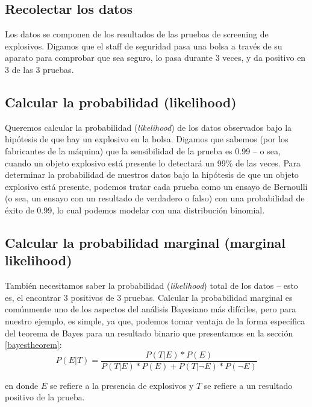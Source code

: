\documentclass[
  12pt,
]{book}
\begin{document}
\hypertarget{recolectar-los-datos}{%
\subsection{Recolectar los datos}\label{recolectar-los-datos}}

Los datos se componen de los resultados de las pruebas de screening de explosivos. Digamos que el staff de seguridad pasa una bolsa a través de su aparato para comprobar que sea seguro, lo pasa durante 3 veces, y da positivo en 3 de las 3 pruebas.

\hypertarget{calcular-la-probabilidad-likelihood}{%
\subsection{Calcular la probabilidad (likelihood)}\label{calcular-la-probabilidad-likelihood}}

Queremos calcular la probabilidad (\emph{likelihood}) de los datos observados bajo la hipótesis de que hay un explosivo en la bolsa. Digamos que sabemos (por los fabricantes de la máquina) que la sensibilidad de la prueba es 0.99 -- o sea, cuando un objeto explosivo está presente lo detectará un 99\% de las veces. Para determinar la probabilidad de nuestros datos bajo la hipótesis de que un objeto explosivo está presente, podemos tratar cada prueba como un ensayo de Bernoulli (o sea, un ensayo con un resultado de verdadero o falso) con una probabilidad de éxito de 0.99, lo cual podemos modelar con una distribución binomial.

\hypertarget{calcular-la-probabilidad-marginal-marginal-likelihood}{%
\subsection{Calcular la probabilidad marginal (marginal likelihood)}\label{calcular-la-probabilidad-marginal-marginal-likelihood}}

También necesitamos saber la probabilidad (\emph{likelihood}) total de los datos -- esto es, el encontrar 3 positivos de 3 pruebas. Calcular la probabilidad marginal es comúnmente uno de los aspectos del análisis Bayesiano más difíciles, pero para nuestro ejemplo, es simple, ya que, podemos tomar ventaja de la forma específica del teorema de Bayes para un resultado binario que presentamos en la sección \ref{bayestheorem}:
\[
P(E|T) = \frac{P(T|E)*P(E)}{P(T|E)*P(E) + P(T|\neg E)*P(\neg E)}
\]

en donde \(E\) se refiere a la presencia de explosivos y \(T\) se refiere a un resultado positivo de la prueba.
\end{document}
